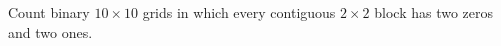 Count binary $10\times10$ grids in which every contiguous $2\times2$ block has two zeros and two ones.
